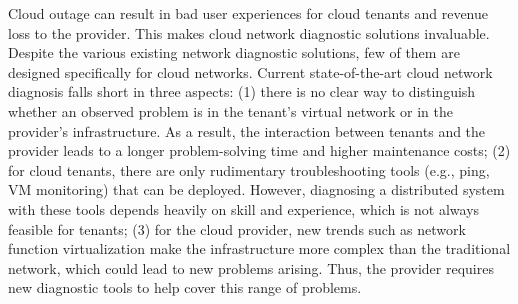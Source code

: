 %
%
%




Cloud outage can result in bad user experiences for cloud tenants and revenue loss to the provider. 
This makes cloud network diagnostic solutions invaluable.
Despite the various existing network diagnostic solutions, few of them are designed 
specifically for cloud networks. Current state-of-the-art cloud network diagnosis falls short 
in three aspects: (1) there is no clear way to distinguish whether an observed problem is in the 
tenant's virtual network or in the provider's infrastructure. As a result, 
the interaction between tenants and the provider leads to a longer problem-solving time 
and higher maintenance costs; (2) for cloud tenants, there are only rudimentary troubleshooting 
tools (e.g., ping, VM monitoring) that can be deployed. However, diagnosing a distributed 
system with these tools depends heavily on skill and experience, which is not always 
feasible for tenants; (3) for the cloud provider, new trends such as network function 
virtualization make the infrastructure more complex than the traditional network, 
which could lead to new problems arising. Thus, the provider requires new diagnostic tools to help
cover this range of problems.

